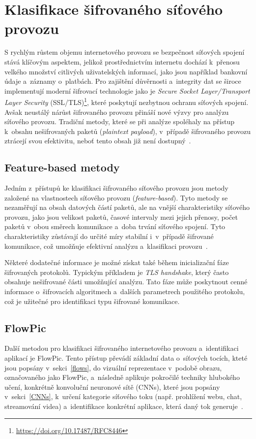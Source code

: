 \section{Klasifikace šifrovaného síťového provozu}
S rychlým růstem objemu internetového provozu se bezpečnost síťových spojení stává klíčovým aspektem, jelikož prostřednictvím internetu dochází k~přenosu velkého množství citlivých uživatelských informací, jako jsou například bankovní údaje a~záznamy o~platbách. Pro zajištění důvěrnosti a~integrity dat se široce implementují moderní šifrovací technologie jako je \textit{Secure Socket Layer/Transport Layer Security} (SSL/TLS)\footnote{\url{https://doi.org/10.17487/RFC8446}}, které poskytují nezbytnou ochranu síťových spojení. Avšak neustálý nárůst šifrovaného provozu přináší nové výzvy pro analýzu síťového provozu. Tradiční metody, které se při analýze spoléhaly na přístup k~obsahu nešifrovaných paketů (\textit{plaintext payload}), v~případě šifrovaného provozu ztrácejí svou efektivitu, neboť tento obsah již není dostupný~\cite{encrypted_traffic}.

\subsection{Feature-based metody}
Jedním z~přístupů ke klasifikaci šifrovaného síťového provozu jsou metody založené na vlastnostech síťového provozu (\textit{feature-based}). Tyto metody se nezaměřují na obsah datových částí paketů, ale na vnější charakteristiky síťového provozu, jako jsou velikost paketů, časové intervaly mezi jejich přenosy, počet paketů v~obou směrech komunikace a~doba trvání síťového spojení. Tyto charakteristiky zůstávají do určité míry stabilní i~v~případě šifrované komunikace, což umožňuje efektivní analýzu a~klasifikaci provozu~\cite{survey_enc_traffic}.

Některé dodatečné informace je možné získat také během inicializační fáze šifrovaných protokolů. Typickým příkladem je \textit{TLS handshake}, který často obsahuje nešifrované části umožňující analýzu. Tato fáze může poskytnout cenné informace o~šifrovacích algoritmech a~dalších parametrech použitého protokolu, což je užitečné pro identifikaci typu šifrované komunikace.

\subsection{FlowPic}
\label{flowpic_text}
Další metodou pro klasifikaci šifrovaného internetového provozu a~identifikaci aplikací je FlowPic. Tento přístup převádí základní data o~síťových tocích, kteté jsou popsány v~sekci~\ref{flows}, do vizuální reprezentace v~podobě obrazu, označovaného jako FlowPic, a~následně aplikuje pokročilé techniky hlubokého učení, konkrétně konvoluční neuronové sítě (CNNs), které jsou popsány v~sekci~\ref{CNNs}, k~určení kategorie síťového toku (např. prohlížení webu, chat, streamování videa) a~identifikace konkrétní aplikace, která daný tok generuje~\cite{FlowPic}.

